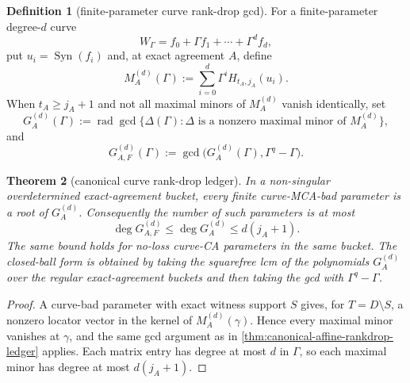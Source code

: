 \documentclass[11pt]{article}
\newtheorem{theorem}{Theorem}[section]
\theoremstyle{definition}
\newtheorem{definition}[theorem]{Definition}
\theoremstyle{remark}
\newcommand{\Syn}{\operatorname{Syn}}
\begin{document}
\begin{definition}[finite-parameter curve rank-drop gcd]
\label{def:curve-rankdrop-gcd}
For a finite-parameter degree-$d$ curve
\[
        W_\Gamma=f_0+\Gamma f_1+\cdots+\Gamma^d f_d,
\]
put $u_i=\Syn(f_i)$ and, at exact agreement $A$, define
\[
        M_A^{(d)}(\Gamma):=
        \sum_{i=0}^{d}\Gamma^i H_{t_A,j_A}(u_i).
\]
When $t_A\ge j_A+1$ and not all maximal minors of $M_A^{(d)}$ vanish
identically, set
\[
        G_A^{(d)}(\Gamma)
        :=\operatorname{rad}\gcd\{\Delta(\Gamma):
              \Delta\text{ is a nonzero maximal minor of }M_A^{(d)}\},
\]
and
\[
        G_{A,F}^{(d)}(\Gamma):=
        \gcd\bigl(G_A^{(d)}(\Gamma),\Gamma^q-\Gamma\bigr).
\]
\end{definition}

\begin{theorem}[canonical curve rank-drop ledger]
\label{thm:canonical-curve-rankdrop-ledger}
In a non-singular overdetermined exact-agreement bucket, every finite
curve-MCA-bad parameter is a root of $G_A^{(d)}$.  Consequently the number of
such parameters is at most
\[
        \deg G_{A,F}^{(d)}
        \le \deg G_A^{(d)}
        \le d(j_A+1).
\]
The same bound holds for no-loss curve-CA parameters in the same bucket.  The
closed-ball form is obtained by taking the squarefree lcm of the polynomials
$G_A^{(d)}$ over the regular exact-agreement buckets and then taking the gcd with
$\Gamma^q-\Gamma$.
\end{theorem}

\begin{proof}
A curve-bad parameter with exact witness support $S$ gives, for
$T=D\setminus S$, a nonzero locator vector in the kernel of
$M_A^{(d)}(\gamma)$.  Hence every maximal minor vanishes at $\gamma$, and the
same gcd argument as in \cref{thm:canonical-affine-rankdrop-ledger} applies.
Each matrix entry has degree at most $d$ in $\Gamma$, so each maximal minor has
degree at most $d(j_A+1)$.
\end{proof}
\end{document}

